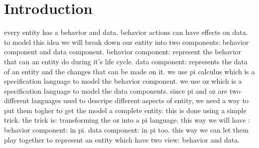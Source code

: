 \chapter{Introduction}
\pagestyle{scrheadings}	
\setcounter{page}{0}
\label{chp_introduction}
every entity has a behavior and data. behavior actions can have effects on data. to model this idea we will break down our entity into two components: behavior component and data component.
behavior component: represent the behavior that can an entity do during it's life cycle.
data component: represents the data of an entity and the changes that can be made on it.
we use pi calculus which is a specification language to model the behavior component.
we use oz which is a specification language to model the data components.
since pi and oz are two different languages used to descripe different aspects of entity, we need a way to put them togher to get the model a complete entity.
this is done using a simple trick. the trick is: transforming the oz into a pi language. this way we will have :
behavior component: in pi.
data component: in pi too.
this way we can let them play together to represent an entity which have two view: behavior and data.


